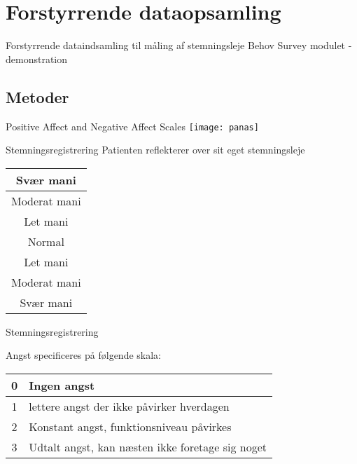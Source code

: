 \section{Forstyrrende dataopsamling}
{ %
\begin{frame} %
Forstyrrende dataindsamling
	 til måling af stemningsleje
	Behov
	Survey modulet - demonstration	
\end{frame}}
	
\subsection{Metoder}

{ %
\begin{frame}{Positive Affect and Negative Affect Scales} %
\texttt{[image: panas]}
	
\end{frame}}

{ %
	\begin{frame}{Stemningsregistrering} %
		Patienten reflekterer over sit eget stemningsleje
		
		\begin{center}
		\begin{tabular}{|c|}
			\hline \cellcolor{red!90} Svær mani \\ 
			\hline \cellcolor{red!60} Moderat mani \\ 
			\hline \cellcolor{red!30} Let mani \\ 
			\hline \cellcolor{yellow!70} Normal \\ 
			\hline \cellcolor{blue!30} Let mani \\ 
			\hline \cellcolor{blue!60} Moderat mani \\ 
			\hline \cellcolor{blue!90} Svær mani \\ 
			\hline 
		\end{tabular} 
		\end{center}
	\end{frame}}
	
{ %
	\begin{frame}{Stemningsregistrering} %

		Angst specificeres på følgende skala:
		\begin{tabular}{| c | l|}
			\hline 0 & Ingen angst \\ 
			\hline 1 & lettere angst der ikke påvirker hverdagen\\ 
			\hline 2 & Konstant angst, funktionsniveau påvirkes\\ 
			\hline 3 & Udtalt angst, kan næsten ikke foretage sig noget\\
			\hline
		\end{tabular} 
	\end{frame}}
	
